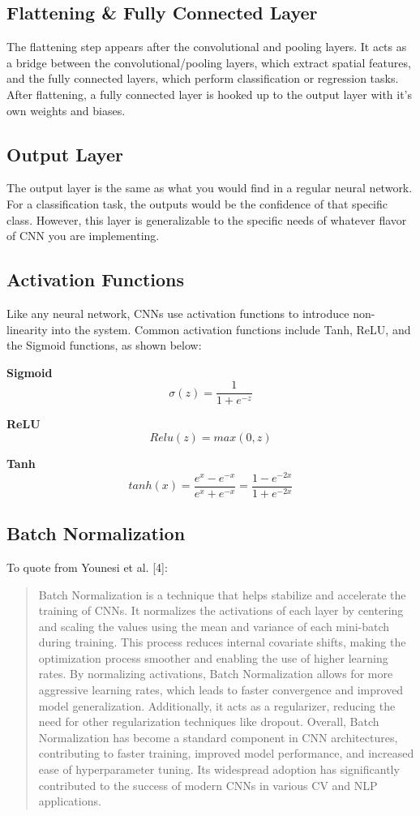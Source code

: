 \documentclass{article}
\begin{document}
    \subsection{Flattening \& Fully Connected Layer}
        The flattening step appears after the convolutional and pooling layers. It acts as a bridge between the convolutional/pooling layers, which extract spatial features, and the fully connected layers, which perform classification or regression tasks. After flattening, a fully connected layer is hooked up to the output layer with it's own weights and biases.
        
    \subsection{Output Layer}
        The output layer is the same as what you would find in a regular neural network. For a classification task, the outputs would be the confidence of that specific class. However, this layer is generalizable to the specific needs of whatever flavor of CNN you are implementing.

    \subsection{Activation Functions}
        Like any neural network, CNNs use activation functions to introduce non-linearity into the system. Common activation functions include Tanh, ReLU, and the Sigmoid functions, as shown below:

        \textbf{Sigmoid}
        \[ \sigma(z) = \frac{1} {1 + e^{-z}} \]

        \textbf{ReLU}
        \[ Relu(z) = max(0, z) \]

        \textbf{Tanh}
        \[ tanh(x) = \frac{e^x - e^{-x}}{e^x + e^{-x}} = \frac{1 - e^{-2x}}{1 + e^{-2x}} \]

    \subsection{Batch Normalization}
        To quote from Younesi et al. [4]:

        \begin{quote}
            Batch Normalization is a technique that helps stabilize and accelerate the training of CNNs. It normalizes the activations of each layer by centering and scaling the values using the mean and variance of each mini-batch during training. This process reduces internal covariate shifts, making the optimization process smoother and enabling the use of higher learning rates. By normalizing activations, Batch Normalization allows for more aggressive learning rates, which leads to faster convergence and improved model generalization. Additionally, it acts as a regularizer, reducing the need for other regularization techniques like dropout. Overall, Batch Normalization has become a standard component in CNN architectures, contributing to faster training, improved model performance, and increased ease of hyperparameter tuning. Its widespread adoption has significantly contributed to the success of modern CNNs in various CV and NLP applications.
        \end{quote}
\end{document}
